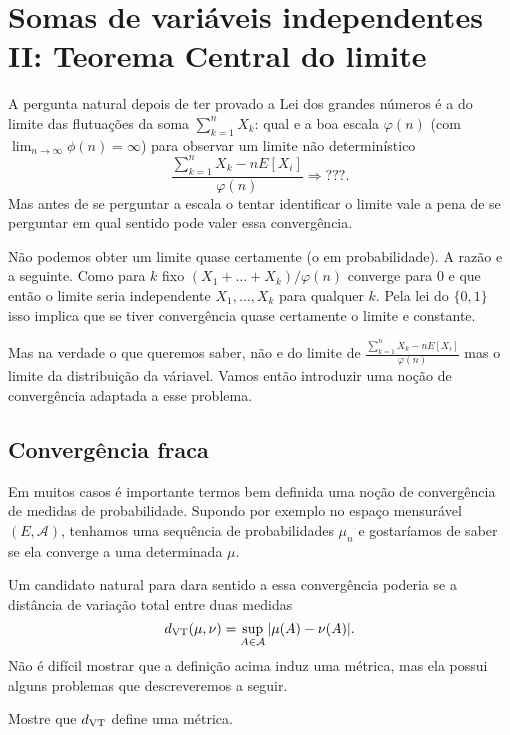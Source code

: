 \chapter{Somas de variáveis independentes II: Teorema Central do limite}

A pergunta natural depois de ter provado a Lei dos grandes números é a do limite das flutuações da soma $\sum_{k=1}^n X_k$: qual e a boa escala $\varphi(n)$ (com $\lim_{n\to \infty}\phi(n)=\infty$)
para observar um limite não determinístico 
$$\frac{\sum_{k=1}^n X_k - nE[X_i]}{\varphi(n)} \Rightarrow ???.$$
Mas antes de se perguntar a escala o tentar identificar o limite vale a pena de se perguntar em qual sentido pode valer essa convergência.

\medskip

Não podemos obter um limite quase certamente (o em probabilidade). A razão e a seguinte. Como para $k$ fixo 
$(X_1+\dots+X_k)/\varphi(n)$ converge para $0$ e que então o limite seria independente $X_1,\dots, X_k$ para qualquer $k$.
Pela lei do $\{0,1\}$ isso implica que se tiver convergência quase certamente o limite e constante.

\medskip

Mas na verdade o que queremos saber, não e do limite de $\frac{\sum_{k=1}^n X_k - nE[X_i]}{\varphi(n)}$ mas o limite da distribuição da váriavel.
Vamos então introduzir uma noção de convergência adaptada a esse problema.


\section{Convergência fraca}

Em muitos casos é importante termos bem definida uma noção de convergência de medidas de probabilidade.
Supondo por exemplo no espaço mensurável $(E,\mathcal{A})$, tenhamos uma sequência de probabilidades $\mu_n$ e 
gostaríamos de saber se ela converge a uma determinada $\mu$.

Um candidato natural para dara sentido a essa convergência poderia se a distância de variação total entre duas medidas
\begin{equation}
  d_{\operatorname{VT}}(\mu,\nu) = \sup_{A \in \mathcal{A}} |\mu(A) - \nu(A)|.
\end{equation}
Não é difícil mostrar que a definição acima induz uma métrica, mas ela possui alguns problemas que descreveremos a seguir.

\begin{exercise}
  Mostre que $d_{\operatorname{VT}}$ define uma métrica.
\end{exercise}

